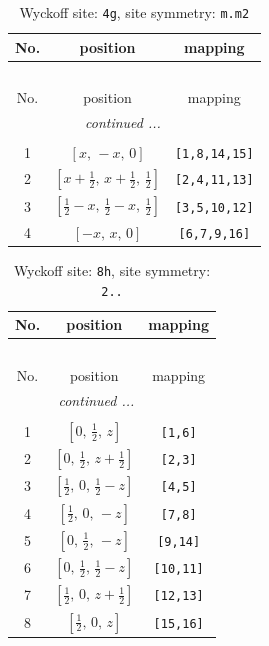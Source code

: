 \documentclass[fleqn,8pt]{jsarticle}
\begin{document}
\renewcommand{\arraystretch}{1.2}
\begin{longtable}{ccc}
\caption{Wyckoff site: {\tt 4g}, site symmetry: {\tt m.m2}}
 \\
 \hline \hline
No. & position & mapping \\ \hline \endfirsthead

\multicolumn{2}{l}{\tablename\ \thetable{}} \\
 \hline \hline
No. & position & mapping \\ \hline \endhead

 \hline \hline
\multicolumn{2}{r}{\footnotesize\it continued ...} \\ \endfoot

 \hline \hline
\multicolumn{2}{r}{} \\ \endlastfoot

1 & $\left[ x,\, - x,\, 0 \right]$ & {\tt [1,8,14,15]} \\ \hline
2 & $\left[ x + \frac{1}{2},\, x + \frac{1}{2},\, \frac{1}{2} \right]$ & {\tt [2,4,11,13]} \\ \hline
3 & $\left[ \frac{1}{2} - x,\, \frac{1}{2} - x,\, \frac{1}{2} \right]$ & {\tt [3,5,10,12]} \\ \hline
4 & $\left[ - x,\, x,\, 0 \right]$ & {\tt [6,7,9,16]} \\
\end{longtable}
\renewcommand{\arraystretch}{1.2}
\begin{longtable}{ccc}
\caption{Wyckoff site: {\tt 8h}, site symmetry: {\tt 2..}}
 \\
 \hline \hline
No. & position & mapping \\ \hline \endfirsthead

\multicolumn{2}{l}{\tablename\ \thetable{}} \\
 \hline \hline
No. & position & mapping \\ \hline \endhead

 \hline \hline
\multicolumn{2}{r}{\footnotesize\it continued ...} \\ \endfoot

 \hline \hline
\multicolumn{2}{r}{} \\ \endlastfoot

1 & $\left[ 0,\, \frac{1}{2},\, z \right]$ & {\tt [1,6]} \\ \hline
2 & $\left[ 0,\, \frac{1}{2},\, z + \frac{1}{2} \right]$ & {\tt [2,3]} \\ \hline
3 & $\left[ \frac{1}{2},\, 0,\, \frac{1}{2} - z \right]$ & {\tt [4,5]} \\ \hline
4 & $\left[ \frac{1}{2},\, 0,\, - z \right]$ & {\tt [7,8]} \\ \hline
5 & $\left[ 0,\, \frac{1}{2},\, - z \right]$ & {\tt [9,14]} \\ \hline
6 & $\left[ 0,\, \frac{1}{2},\, \frac{1}{2} - z \right]$ & {\tt [10,11]} \\ \hline
7 & $\left[ \frac{1}{2},\, 0,\, z + \frac{1}{2} \right]$ & {\tt [12,13]} \\ \hline
8 & $\left[ \frac{1}{2},\, 0,\, z \right]$ & {\tt [15,16]} \\
\end{longtable}
\end{document}

